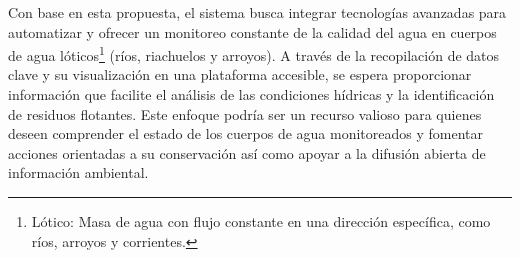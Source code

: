 Con base en esta propuesta, el sistema busca integrar tecnologías avanzadas para automatizar y ofrecer un monitoreo constante de la calidad del agua en cuerpos de agua lóticos\footnote{Lótico: Masa de agua con flujo constante en una dirección específica, como ríos, arroyos y corrientes\cite{conagua2024}.} (ríos, riachuelos y arroyos). A través de la recopilación de datos clave y su visualización en una plataforma accesible, se espera proporcionar información que facilite el análisis de las condiciones hídricas y la identificación de residuos flotantes. Este enfoque podría ser un recurso valioso para quienes deseen comprender el estado de los cuerpos de agua monitoreados y fomentar acciones orientadas a su conservación así como apoyar a la difusión abierta de información ambiental.






